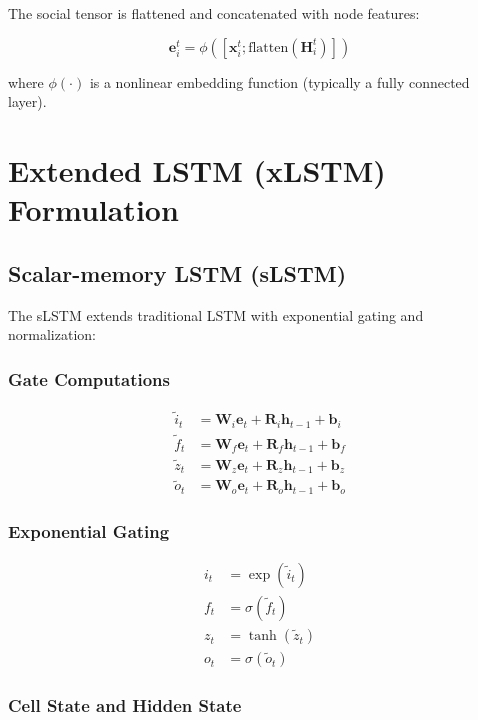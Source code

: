 \documentclass[11pt,a4paper]{article}
\begin{document}
The social tensor is flattened and concatenated with node features:

\begin{equation}
\mathbf{e}_i^t = \phi([\mathbf{x}_i^t; \text{flatten}(\mathbf{H}_i^t)])
\end{equation}

where $\phi(\cdot)$ is a nonlinear embedding function (typically a fully connected layer).

\section{Extended LSTM (xLSTM) Formulation}

\subsection{Scalar-memory LSTM (sLSTM)}

The sLSTM extends traditional LSTM with exponential gating and normalization:

\subsubsection{Gate Computations}

\begin{align}
\tilde{i}_t &= \mathbf{W}_i \mathbf{e}_t + \mathbf{R}_i \mathbf{h}_{t-1} + \mathbf{b}_i \\
\tilde{f}_t &= \mathbf{W}_f \mathbf{e}_t + \mathbf{R}_f \mathbf{h}_{t-1} + \mathbf{b}_f \\
\tilde{z}_t &= \mathbf{W}_z \mathbf{e}_t + \mathbf{R}_z \mathbf{h}_{t-1} + \mathbf{b}_z \\
\tilde{o}_t &= \mathbf{W}_o \mathbf{e}_t + \mathbf{R}_o \mathbf{h}_{t-1} + \mathbf{b}_o
\end{align}

\subsubsection{Exponential Gating}

\begin{align}
i_t &= \exp(\tilde{i}_t) \\
f_t &= \sigma(\tilde{f}_t) \\
z_t &= \tanh(\tilde{z}_t) \\
o_t &= \sigma(\tilde{o}_t)
\end{align}

\subsubsection{Cell State and Hidden State}
\end{document}
